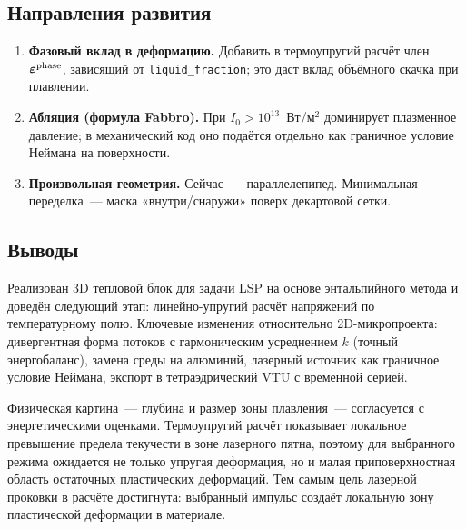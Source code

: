 \subsection{Направления развития}

\begin{enumerate}
  \item \textbf{Фазовый вклад в деформацию.}
        Добавить в термоупругий расчёт член
        $\boldsymbol{\varepsilon}^{\rm phase}$, зависящий от
        \texttt{liquid\_fraction}; это даст вклад объёмного скачка
        при плавлении.
  \item \textbf{Абляция (формула Fabbro).} При $I_0 > 10^{13}$~Вт/м$^2$
        доминирует плазменное давление; в механический код оно
        подаётся отдельно как граничное условие Неймана на поверхности.

  \item \textbf{Произвольная геометрия.} Сейчас~--- параллелепипед.
        Минимальная переделка~--- маска «внутри/снаружи» поверх
        декартовой сетки.

\end{enumerate}

\subsection{Выводы}

Реализован 3D тепловой блок для задачи LSP на основе энтальпийного
метода и доведён следующий этап: линейно-упругий расчёт напряжений
по температурному полю. Ключевые изменения относительно 2D-микропроекта:
дивергентная форма потоков с гармоническим усреднением $k$ (точный
энергобаланс), замена среды на алюминий, лазерный источник как
граничное условие Неймана, экспорт в тетраэдрический VTU с временной
серией.

Физическая картина~--- глубина и размер зоны плавления~--- согласуется
с энергетическими оценками. Термоупругий расчёт показывает локальное
превышение предела текучести в зоне лазерного пятна, поэтому для
выбранного режима ожидается не только упругая деформация, но и малая
приповерхностная область остаточных пластических деформаций. Тем самым цель
лазерной проковки в расчёте достигнута: выбранный импульс создаёт
локальную зону пластической деформации в материале.
